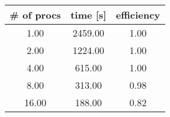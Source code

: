 \begin{tabular}{ccc}
 \# of procs & time [s] & efficiency \\
\hline
1.00 & 2459.00 & 1.00 \\
2.00 & 1224.00 & 1.00 \\
4.00 & 615.00 & 1.00 \\
8.00 & 313.00 & 0.98 \\
16.00 & 188.00 & 0.82 \\
\hline
\end{tabular}
